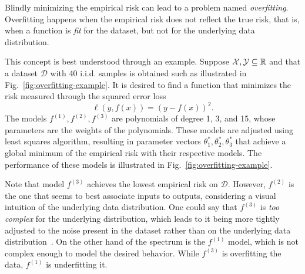 Blindly minimizing the empirical risk can lead to a problem named \emph{overfitting}.
Overfitting happens when the empirical risk does not reflect the true risk, that is, when a function is \emph{fit} for the dataset, but not for the underlying data distribution.

This concept is best understood through an example.
Suppose $\mathcal{X},\mathcal{Y}\subseteq\mathbb{R}$ and that a dataset $\mathcal{D}$ with 40 i.i.d. samples is obtained such as illustrated in Fig.~\ref{fig:overfitting-example}.
It is desired to find a function that minimizes the risk measured through the squared error loss \[
    \ell(y,f(x)) = (y-f(x))^2
.\] 
The models $f^{(1)},f^{(2)},f^{(3)}$ are polynomials of degree 1, 3, and 15, whose parameters are the weights of the polynomials.
These models are adjusted using least squares algorithm, resulting in parameter vectors $\theta_1^*,\theta_2^*,\theta_3^*$ that achieve a global minimum of the empirical risk with their respective models.
The performance of these models is illustrated in Fig.~\ref{fig:overfitting-example}.

Note that model $f^{(3)}$ achieves the lowest empirical risk on $\mathcal{D}$.
However, $f^{(2)}$ is the one that seems to best associate inputs to outputs, considering a visual intuition of the underlying data distribution.
One could say that $f^{(3)}$ is \emph{too complex} for the underlying distribution, which leads to it being more tightly adjusted to the noise present in the dataset rather than on the underlying data distribution~\cite{murphyMachineLearningProbabilistic2013}.
On the other hand of the spectrum is the $f^{(1)}$ model, which is not complex enough to model the desired behavior.
While $f^{(3)}$ is overfitting the data, $f^{(1)}$ is underfitting it.

